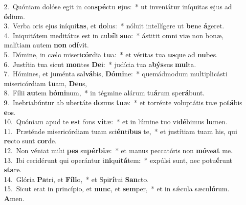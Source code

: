 {2.~}Quóniam dolóse egit in con\textbf{spé}ctu \textbf{e}jus:~* ut inveniátur iníquitas \textbf{e}jus ad \textbf{ó}dium.\\
{3.~}Verba oris ejus iníqui\textbf{tas}, et \textbf{do}lus:~* nóluit intellígere ut \textbf{be}ne \textbf{á}geret.\\
{4.~}Iniquitátem meditátus est in cu\textbf{bí}li \textbf{su}o:~* ástitit omni viæ non bonæ, malítiam autem \textbf{non} o\textbf{dí}vit.\\
{5.~}Dómine, in cælo miseri\textbf{cór}dia \textbf{tu}a:~* et véritas tua \textbf{us}que ad \textbf{nu}bes.\\
{6.~}Justítia tua sicut \textbf{mon}tes \textbf{De}i:~* judícia tua a\textbf{býs}sus \textbf{mul}ta.\\
{7.~}Hómines, et juménta sal\textbf{vá}bis, \textbf{Dó}\textbf{mi}ne:~* quemádmodum multiplicásti misericórdiam \textbf{tu}am, \textbf{De}us,\\
{8.~}Fílii \textbf{au}tem \textbf{hó}\textbf{mi}num,~* in tégmine alárum tu\textbf{á}rum spe\textbf{rá}bunt.\\
{9.~}Inebriabúntur ab ubertáte \textbf{do}mus \textbf{tu}æ:~* et torrénte voluptátis tuæ po\textbf{tá}bis \textbf{e}os.\\
{10.~}Quóniam apud te \textbf{est} fons \textbf{vi}tæ:~* et in lúmine tuo vi\textbf{dé}bimus \textbf{lu}men.\\
{11.~}Præténde misericórdiam tuam sci\textbf{én}ti\textbf{bus} te,~* et justítiam tuam his, qui \textbf{re}cto sunt \textbf{cor}de.\\
{12.~}Non véniat mihi \textbf{pes} su\textbf{pér}\textbf{bi}æ:~* et manus peccatóris non \textbf{mó}ve\textbf{at} me.\\
{13.~}Ibi cecidérunt qui operántur i\textbf{ni}qui\textbf{tá}tem:~* expúlsi sunt, nec potu\textbf{é}runt \textbf{sta}re.\\
{14.~}Glória \textbf{Pa}tri, et \textbf{Fí}\textbf{li}o,~* et Spi\textbf{rí}tui \textbf{San}cto.\\
{15.~}Sicut erat in princípio, et \textbf{nunc}, et \textbf{sem}per,~* et in sǽcula sæcu\textbf{ló}rum. \textbf{A}men.\\
